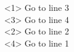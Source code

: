 \documentclass[beamer,preview,multi]{standalone}
\begin{document}
\begin{standaloneframe}
\begin{myenv}
\begin{pseudo}
    <1>  Go to line 3  \\
    <3>  Go to line 4  \\
    <2>  Go to line 2  \\
    <4>  Go to line 1  \\
\end{pseudo}
\end{myenv}
\end{standaloneframe}
\end{document}
